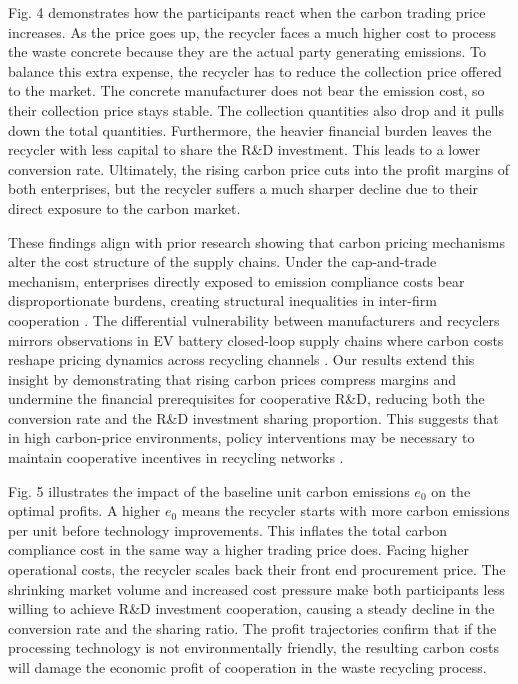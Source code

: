 \documentclass[authoryear,preprint,review,times,10pt]{elsarticle}
\begin{document}
Fig. 4 demonstrates how the participants react when the carbon trading price increases. As the price goes up, the recycler faces a much higher cost to process the waste concrete because they are the actual party generating emissions. To balance this extra expense, the recycler has to reduce the collection price offered to the market. The concrete manufacturer does not bear the emission cost, so their collection price stays stable. The collection quantities also drop and it pulls down the total quantities. Furthermore, the heavier financial burden leaves the recycler with less capital to share the R\&D investment. This leads to a lower conversion rate. Ultimately, the rising carbon price cuts into the profit margins of both enterprises, but the recycler suffers a much sharper decline due to their direct exposure to the carbon market.

These findings align with prior research showing that carbon pricing mechanisms alter the cost structure of the supply chains. Under the cap-and-trade mechanism, enterprises directly exposed to emission compliance costs bear disproportionate burdens, creating structural inequalities in inter-firm cooperation \citep{bai2022Distributionally}. The differential vulnerability between manufacturers and recyclers mirrors observations in EV battery closed-loop supply chains where carbon costs reshape pricing dynamics across recycling channels \citep{wu2024Electric}. Our results extend this insight by demonstrating that rising carbon prices compress margins and undermine the financial prerequisites for cooperative R\&D, reducing both the conversion rate and the R\&D investment sharing proportion. This suggests that in high carbon-price environments, policy interventions may be necessary to maintain cooperative incentives in recycling networks \citep{huang2024Optimal}.

Fig. 5 illustrates the impact of the baseline unit carbon emissions $e_0$ on the optimal profits. A higher $e_0$ means the recycler starts with more carbon emissions per unit before technology improvements. This inflates the total carbon compliance cost in the same way a higher trading price does. Facing higher operational costs, the recycler scales back their front end procurement price. The shrinking market volume and increased cost pressure make both participants less willing to achieve R\&D investment cooperation, causing a steady decline in the conversion rate and the sharing ratio. The profit trajectories confirm that if the processing technology is not environmentally friendly, the resulting carbon costs will damage the economic profit of cooperation in the waste recycling process.
\end{document}
